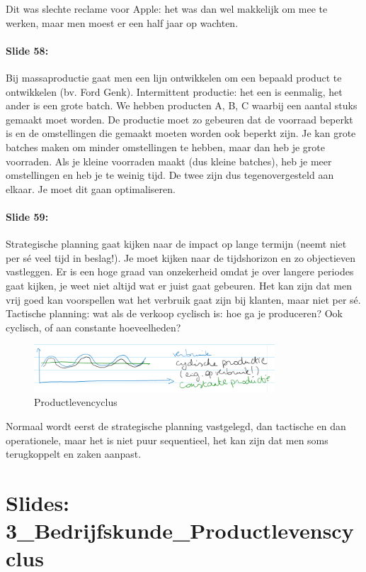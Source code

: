 \documentclass[10pt,a4paper]{report}
\begin{document}
Dit was slechte reclame voor Apple: het was dan wel makkelijk om mee te werken, maar men moest er een half jaar op wachten.

\paragraph{Slide 58:} Bij massaproductie gaat men een lijn ontwikkelen om een bepaald product te ontwikkelen (bv. Ford Genk). Intermittent productie: het een is eenmalig, het ander is een grote batch. We hebben producten A, B, C waarbij een aantal stuks gemaakt moet worden. De productie moet zo gebeuren dat de voorraad beperkt is en de omstellingen die gemaakt moeten worden ook beperkt zijn. Je kan grote batches maken om minder omstellingen te hebben, maar dan heb je grote voorraden. Als je kleine voorraden maakt (dus kleine batches), heb je meer omstellingen en heb je te weinig tijd. De twee zijn dus tegenovergesteld aan elkaar. Je moet dit gaan optimaliseren.

\paragraph{Slide 59:} Strategische planning gaat kijken naar de impact op lange termijn (neemt niet per s\'e veel tijd in beslag!). Je moet kijken naar de tijdshorizon en zo objectieven vastleggen. Er is een hoge graad van onzekerheid omdat je over langere periodes gaat kijken, je weet niet altijd wat er juist gaat gebeuren. Het kan zijn dat men vrij goed kan voorspellen wat het verbruik gaat zijn bij klanten, maar niet per s\'e.\\
Tactische planning: wat als de verkoop cyclisch is: hoe ga je produceren? Ook cyclisch, of aan constante hoeveelheden?


\begin{figure}[h!]
\centering
\includegraphics[width=90mm]{Les02_02.png}
\caption{Productlevencyclus} 
\label{les02_02}
\end{figure}


Normaal wordt eerst de strategische planning vastgelegd, dan tactische en dan operationele, maar het is niet puur sequentieel, het kan zijn dat men soms terugkoppelt en zaken aanpast.

\section{Slides: 3\_Bedrijfskunde\_Productlevenscyclus}
\end{document}
